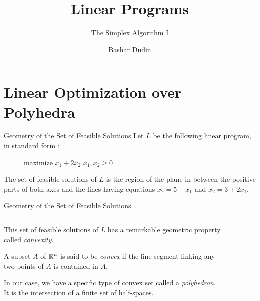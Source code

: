 \documentclass[32pt, aspectratio = 169]{beamer}
\author[BD]{Bashar Dudin}
\institute[]{EPITA}
\title{Linear Programs} %
\subtitle{The Simplex Algorithm I}
\begin{document}
\begin{frame}[plain]
\titlepage %
\end{frame}

\section{Linear Optimization over Polyhedra}

\begin{frame}{Geometry of the Set of Feasible Solutions}
    Let $L$ be the following linear program, in standard form :
    \begin{figure}
        \begin{linearProg}{
            maximize
            }{
            $x_1 + 2x_2$
            }{
            }{
            $x_1, x_2 \geq 0$
            }
        \end{linearProg}
    \end{figure}

    The set of feasible solutions of $L$ is the region of the plane in
    between the positive parts of both axes and the lines having
    equations $x_2 = 5 - x_1$ and $x_2 = 3 + 2x_1$.
\end{frame}

\begin{frame}{Geometry of the Set of Feasible Solutions}
  \begin{columns}
    \begin{column}{.4\textwidth}
      This set of feasible solutions of $L$ has a remarkable geometric
      property called \textit{convexity}.
      \begin{defn}
        A subset $A$ of $\mathbb{R}^n$ is said to be \emph{convex} if the
        line segment linking any two points of $A$ is contained in
        $A$.
      \end{defn}
      In our case, we have a specific type of convex set called a
      \emph{polyhedron}. It is the intersection of a finite set of
      half-spaces.
    \end{column}
    \begin{column}{.6\textwidth}
      \begin{figure}
      \end{figure}
    \end{column}
  \end{columns}
\end{frame}
\end{document}

